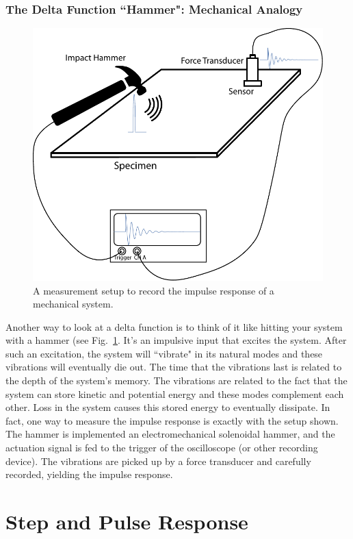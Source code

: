  



\subsubsection{The Delta Function ``Hammer":  Mechanical Analogy}

\begin{figure}[tb]
\begin{center}
\includegraphics[width=.5\columnwidth]{hammer_resonance}
\end{center}
\caption{A measurement setup to record the impulse response of a mechanical system. } \label{fig:hammer_setup}
\end{figure}


Another way to look at a delta function is to think of it like hitting your system with a hammer (see Fig.~\ref{fig:hammer_setup}.  It's an impulsive input that excites the system.  After such an excitation, the system will ``vibrate" in its natural modes and these vibrations will eventually die out.  The time that the vibrations last is related to the depth of the system's memory.  The vibrations are related to the fact that the system can store kinetic and potential energy and these modes complement each other.  Loss in the system causes this stored energy to eventually dissipate.  In fact, one way to measure the impulse response is exactly with the setup shown.  The hammer is implemented an electromechanical solenoidal hammer, and the actuation signal is fed to the trigger of the oscilloscope (or other recording device).  The vibrations are picked up by a force transducer and carefully recorded, yielding the impulse response.     

 

 




\section{Step and Pulse Response}



